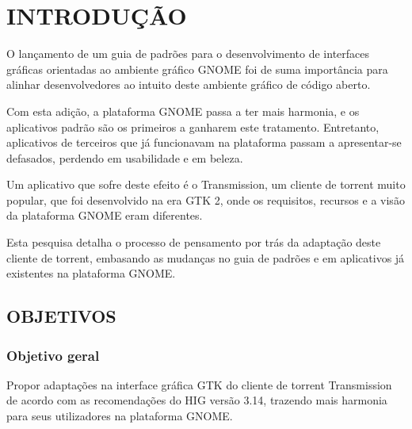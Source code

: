 \documentclass[
	12pt,				%
	openright,			%
	oneside,			%
	a4paper,			%
	chapter=TITLE,		%
	section=TITLE,		%
	brazil				%
	]{abntex2}
\begin{document}
\tableofcontents*
\clearpage

\textual



\chapter{INTRODUÇÃO}

O lançamento de um guia de padrões para o desenvolvimento de interfaces gráficas
orientadas ao ambiente gráfico GNOME foi de suma importância para alinhar
desenvolvedores ao intuito deste ambiente gráfico de código aberto.

Com esta adição, a plataforma GNOME passa a ter mais harmonia, e os aplicativos
padrão são os primeiros a ganharem este tratamento. Entretanto, aplicativos de
terceiros que já funcionavam na plataforma passam a apresentar-se defasados,
perdendo em usabilidade e em beleza.

Um aplicativo que sofre deste efeito é o Transmission, um cliente de torrent
muito popular, que foi desenvolvido na era GTK 2, onde os requisitos, recursos e
a visão da plataforma GNOME eram diferentes.

Esta pesquisa detalha o processo de pensamento por trás da adaptação deste
cliente de torrent, embasando as mudanças no guia de padrões e em aplicativos
já existentes na plataforma GNOME.

\section{OBJETIVOS}

\subsection{Objetivo geral}

Propor adaptações na interface gráfica GTK do cliente de torrent Transmission de
acordo com as recomendações do HIG versão 3.14, trazendo mais harmonia para seus
utilizadores na plataforma GNOME.
\end{document}
